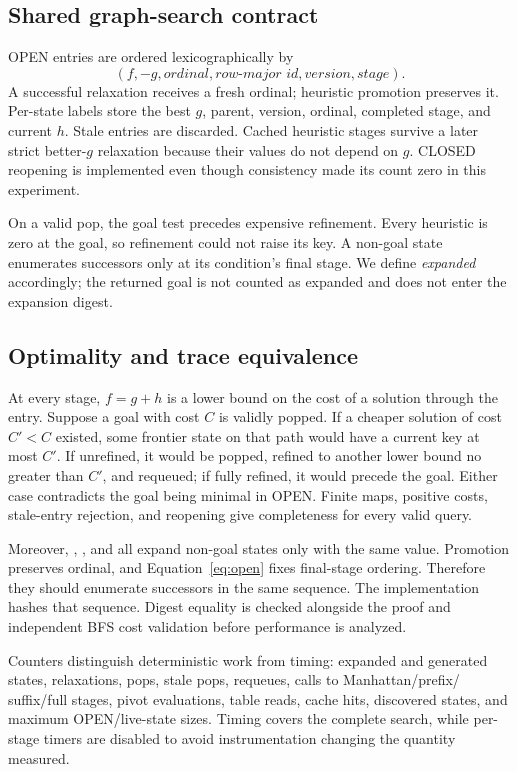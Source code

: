 \subsection{Shared graph-search contract}

OPEN entries are ordered lexicographically by
\begin{equation}
 (f,-g,\textit{ordinal},\textit{row-major id},
  \textit{version},\textit{stage}).
 \label{eq:open}
\end{equation}
A successful relaxation receives a fresh ordinal; heuristic promotion
preserves it.  Per-state labels store the best $g$, parent, version, ordinal,
completed stage, and current $h$.  Stale entries are discarded.  Cached
heuristic stages survive a later strict better-$g$ relaxation because their
values do not depend on $g$.  CLOSED reopening is implemented even though
consistency made its count zero in this experiment.

On a valid pop, the goal test precedes expensive refinement.  Every heuristic
is zero at the goal, so refinement could not raise its key.  A non-goal state
enumerates successors only at its condition's final stage.  We define
\emph{expanded} accordingly; the returned goal is not counted as expanded and
does not enter the expansion digest.

\subsection{Optimality and trace equivalence}

At every stage, $f=g+h$ is a lower bound on the cost of a solution through the
entry.  Suppose a goal with cost $C$ is validly popped.  If a cheaper solution
of cost $C'<C$ existed, some frontier state on that path would have a current
key at most $C'$.  If unrefined, it would be popped, refined to another lower
bound no greater than $C'$, and requeued; if fully refined, it would precede
the goal.  Either case contradicts the goal being minimal in OPEN.  Finite
maps, positive costs, stale-entry rejection, and reopening give completeness
for every valid query.

Moreover, \EagerFull{}, \LazyFull{}, and \Staged{} all expand non-goal states
only with the same \HFull{} value.  Promotion preserves ordinal, and
Equation~\ref{eq:open} fixes final-stage ordering.  Therefore they should
enumerate successors in the same sequence.  The implementation hashes that
sequence.  Digest equality is checked alongside the proof and independent BFS
cost validation before performance is analyzed.

Counters distinguish deterministic work from timing: expanded and generated
states, relaxations, pops, stale pops, requeues, calls to Manhattan/prefix/
suffix/full stages, pivot evaluations, table reads, cache hits, discovered
states, and maximum OPEN/live-state sizes.  Timing covers the complete search,
while per-stage timers are disabled to avoid instrumentation changing the
quantity measured.
